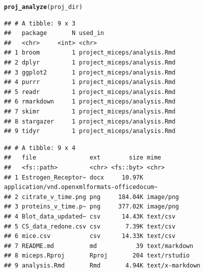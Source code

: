 \documentclass[APA,LATO1COL]{WileyNJD-v2}\usepackage[]{graphicx}\usepackage[]{color}
\makeatletter
\newcommand{\hlstd}[1]{\textcolor[rgb]{0.345,0.345,0.345}{#1}}%
\newcommand{\hlkwd}[1]{\textcolor[rgb]{0.737,0.353,0.396}{\textbf{#1}}}%
\newenvironment{kframe}{%
 \def\at@end@of@kframe{}%
 \ifinner\ifhmode%
  \def\at@end@of@kframe{\end{minipage}}%
  \begin{minipage}{\columnwidth}%
 \fi\fi%
 \def\FrameCommand##1{\hskip\@totalleftmargin \hskip-\fboxsep
 \colorbox{shadecolor}{##1}\hskip-\fboxsep
     \hskip-\linewidth \hskip-\@totalleftmargin \hskip\columnwidth}%
 \MakeFramed {\advance\hsize-\width
   \@totalleftmargin\z@ \linewidth\hsize
   \@setminipage}}%
 {\par\unskip\endMakeFramed%
 \at@end@of@kframe}
\newenvironment{knitrout}{}{} %
\makeatother
\begin{document}
\begin{knitrout}
\color{fgcolor}\begin{kframe}
\begin{alltt}
\hlkwd{proj_analyze}\hlstd{(proj_dir)}
\end{alltt}


{\ttfamily\noindent\itshape\color{messagecolor}{\#\# -- Analysis of reproducibility for project\_miceps --------------- fertile 0.0.0.9027 --}}

{\ttfamily\noindent\itshape\color{messagecolor}{\#\# --\ \  Packages referenced in source code ------------------------- fertile 0.0.0.9027 --}}\begin{verbatim}
## # A tibble: 9 x 3
##   package       N used_in                    
##   <chr>     <int> <chr>                      
## 1 broom         1 project_miceps/analysis.Rmd
## 2 dplyr         1 project_miceps/analysis.Rmd
## 3 ggplot2       1 project_miceps/analysis.Rmd
## 4 purrr         1 project_miceps/analysis.Rmd
## 5 readr         1 project_miceps/analysis.Rmd
## 6 rmarkdown     1 project_miceps/analysis.Rmd
## 7 skimr         1 project_miceps/analysis.Rmd
## 8 stargazer     1 project_miceps/analysis.Rmd
## 9 tidyr         1 project_miceps/analysis.Rmd
\end{verbatim}


{\ttfamily\noindent\itshape\color{messagecolor}{\#\# --\ \  Files present in directory --------------------------------- fertile 0.0.0.9027 --}}\begin{verbatim}
## # A tibble: 9 x 4
##   file               ext        size mime                                       
##   <fs::path>         <chr> <fs::byt> <chr>                                      
## 1 Estrogen_Receptor~ docx     10.97K application/vnd.openxmlformats-officedocum~
## 2 citrate_v_time.png png     184.04K image/png                                  
## 3 proteins_v_time.p~ png     377.02K image/png                                  
## 4 Blot_data_updated~ csv      14.43K text/csv                                   
## 5 CS_data_redone.csv csv       7.39K text/csv                                   
## 6 mice.csv           csv      14.33K text/csv                                   
## 7 README.md          md           39 text/markdown                              
## 8 miceps.Rproj       Rproj       204 text/rstudio                               
## 9 analysis.Rmd       Rmd       4.94K text/x-markdown
\end{verbatim}



\end{kframe}
\end{knitrout}
\end{document}
